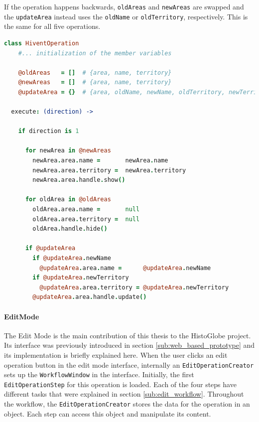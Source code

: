 If the operation happens backwards, \texttt{oldAreas} and \texttt{newAreas} are swapped and the \texttt{updateArea} instead uses the \texttt{oldName} or \texttt{oldTerritory}, respectively. This is the same for all five operations.

\begin{center}
\begin{minipage}[t]{0.9\textwidth}
\begin{lstlisting}[language=coffeescript,
  caption=Execution of an \texttt{HiventOperation} in forward direction,
  label=lst:hivent_operation]
class HiventOperation
    #... initialization of the member variables

    @oldAreas   = []  # {area, name, territory}
    @newAreas   = []  # {area, name, territory}
    @updateArea = {}  # {area, oldName, newName, oldTerritory, newTerritory}

  execute: (direction) ->

    if direction is 1

      for newArea in @newAreas
        newArea.area.name =       newArea.name
        newArea.area.territory =  newArea.territory
        newArea.area.handle.show()

      for oldArea in @oldAreas
        oldArea.area.name =       null
        oldArea.area.territory =  null
        oldArea.handle.hide()

      if @updateArea
        if @updateArea.newName
          @updateArea.area.name =      @updateArea.newName
        if @updateArea.newTerritory
          @updateArea.area.territory = @updateArea.newTerritory
        @updateArea.area.handle.update()
\end{lstlisting}
\end{minipage}
\end{center}


\paragraph{EditMode} %
\label{par:editmode}

The Edit Mode is the main contribution of this thesis to the HistoGlobe project.
Its interface was previously introduced in section \ref{sub:web_based_prototype} and its implementation is briefly explained here. When the user clicks an edit operation button in the edit mode interface, internally an \texttt{EditOperationCreator} sets up the \texttt{WorkflowWindow} in the interface. Initially, the first \texttt{EditOperationStep} for this operation is loaded. Each of the four steps have different tasks that were explained in section \ref{sub:edit_workflow}. Throughout the workflow, the \texttt{EditOperationCreator} stores the data for the operation in an object. Each step can access this object and manipulate its content.

